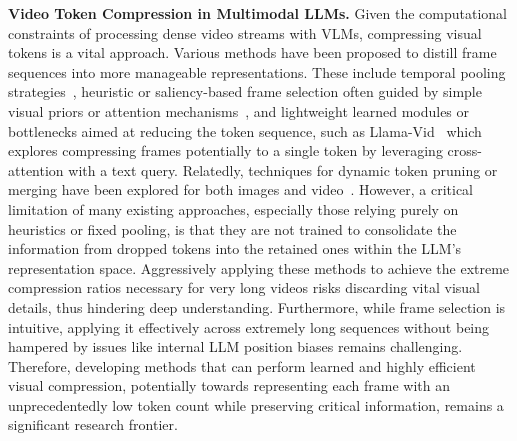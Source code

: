 \noindent \textbf{Video Token Compression in Multimodal LLMs.}\;\; 
Given the computational constraints of processing dense video streams with VLMs, compressing visual tokens is a vital approach. Various methods have been proposed to distill frame sequences into more manageable representations. These include temporal pooling strategies~\cite{fei2024video, maaz2023video}, heuristic or saliency-based frame selection often guided by simple visual priors or attention mechanisms~\cite{shu2024video, song2024moviechat}, and lightweight learned modules or bottlenecks aimed at reducing the token sequence, such as Llama-Vid~\cite{li2024llama} which explores compressing frames potentially to a single token by leveraging cross-attention with a text query. Relatedly, techniques for dynamic token pruning or merging have been explored for both images and video~\cite{ma2023image, xu2022groupvit, bolya2022token, lee2024multi, ren2023testa, choi2024vid, jin2024chat, xu2024slowfast}. However, a critical limitation of many existing approaches, especially those relying purely on heuristics or fixed pooling, is that they are not trained to consolidate the information from dropped tokens into the retained ones within the LLM's representation space. Aggressively applying these methods to achieve the extreme compression ratios necessary for very long videos risks discarding vital visual details, thus hindering deep understanding. Furthermore, while frame selection is intuitive, applying it effectively across extremely long sequences without being hampered by issues like internal LLM position biases remains challenging. Therefore, developing methods that can perform learned and highly efficient visual compression, potentially towards representing each frame with an unprecedentedly low token count while preserving critical information, remains a significant research frontier.